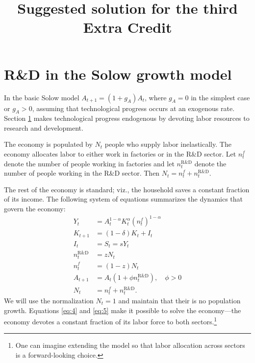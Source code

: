 \documentclass[12pt]{pracjourn_rwr}
\title{Suggested solution for the third  Extra Credit}
\theoremstyle{definition}
\theoremstyle{remark}
\begin{document}
\maketitle

\tableofcontents

\section{R\&D in the Solow growth model}
\label{sec:rd-solow-growth}

In the basic Solow model $A_{t+1} = (1+g_{A})A_{t}$,
where $g_{A} = 0$ in the simplest case or $g_{A} > 0$,
assuming that technological progress occurs at an exogenous rate.
Section \ref{sec:rd-solow-growth} makes technological progress endogenous
by devoting labor resources to research and development.

The economy is populated by $N_{t}$ people who supply labor inelastically.
The economy allocates labor to either work in factories or in the R\&D sector.
Let $n_{t}^{f}$ denote the number of people working in factories and
let $n_{t}^{\text{R\&D}}$ denote the number of people working in the R\&D sector.
Then $N_{t} = n_{t}^{f} + n_{t}^{\text{R\&D}}$.

The rest of the economy is standard; viz.,
the household saves a constant fraction of its income.
The following system of equations summarizes the dynamics that govern the economy:
\begin{align}
\label{eq:1}
Y_{t} &= A_{t}^{1-\alpha} K_{t}^{\alpha} \left( n_{t}^{f} \right)^{1-\alpha} \\
\label{eq:2}
K_{t+1} &= (1-\delta)K_{t} + I_{t} \\
\label{eq:3}
I_{t} &= S_{t} = sY_{t} \\
\label{eq:4}
n_{t}^{\text{R\&D}} &= zN_{t} \\
\label{eq:5}
n_{t}^{f} &= (1-z)N_{t} \\
\label{eq:6}
A_{t+1} &= A_{t} \left( 1+\phi n_{t}^{\text{R\&D}} \right), \quad \phi > 0 \\
\label{eq:7}
N_{t} &= n_{t}^{f} + n_{t}^{\text{R\&D}}. 
\end{align}
We will use the normalization $N_{t} = 1$ and maintain that their is no population growth.
Equations \eqref{eq:4} and \eqref{eq:5} make it possible to solve the economy---the economy devotes a constant fraction of its labor force to both sectors.\footnote{One can imagine extending the model so that labor allocation across sectors is a forward-looking choice.}
\end{document}
